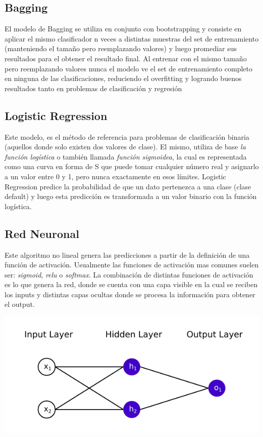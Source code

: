 \documentclass[12pt,a4paper]{article}
\begin{document}
\subsection{Bagging}

El modelo de Bagging se utiliza en conjunto con bootstrapping y consiste en aplicar el mismo clasificador n veces a distintas muestras del set de entrenamiento (manteniendo el tamaño pero reemplazando valores) y luego promediar sus resultados para el obtener el resultado final. 
Al entrenar con el mismo tamaño pero reemplazando valores nunca el modelo ve el set de entrenamiento completo en ninguna de las clasificaciones, reduciendo el overfitting y logrando buenos resultados tanto en problemas de clasificación y regresión

\subsection{Logistic Regression}
Este modelo, es el método de referencia para problemas de clasificación binaria (aquellos donde solo existen dos valores de clase). El mismo, utiliza de base \textit{la función logística} o también llamada \textit{función sigmoidea}, la cual es representada como una curva en forma de S que puede tomar cualquier número real y asignarlo a un valor entre 0 y 1, pero nunca exactamente en esos límites. Logistic Regression predice la probabilidad de que un dato pertenezca a una clase (clase default) y luego esta predicción es transformada a un valor binario con la función logística. 

\subsection{Red Neuronal}
Este algoritmo no lineal genera las predicciones a partir de la definición de una función de activación. Usualmente las funciones de activación mas comunes suelen ser: \textit{sigmoid}, \textit{relu} o \textit{softmax}. La combinación de distintas funciones de activación es lo que genera la red, donde se cuenta con una capa visible en la cual se reciben los inputs y distintas capas ocultas donde se procesa la información para obtener el output.

\begin{center}
    \includegraphics[scale=0.5]{imgs/red neuronal.png}
\end{center}
\end{document}
